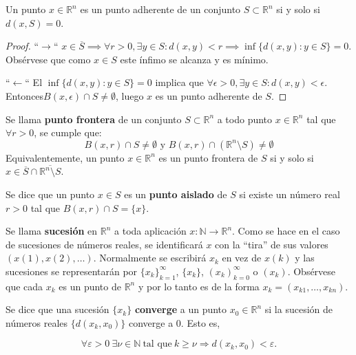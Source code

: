 \begin{teorema}
    Un punto $x \in \mathbb{R}^n$ es un punto adherente de un conjunto $S \subset \mathbb{R}^n$ si y solo si $d(x, S) = 0$.
\end{teorema}
\begin{proof}
    ``$\rightarrow$``
    $x \in \overline{S} \implies \forall r > 0, \exists y \in S : d(x, y) < r \implies \inf\{d(x, y) : y \in S\} = 0$. Obsérvese que como $x \in S$ este ínfimo se alcanza y es mínimo. 

    ``$\leftarrow$``
    El $\inf\{d(x, y) : y \in S\} = 0$ implica que $\forall \epsilon > 0, \exists y \in S : d(x, y) < \epsilon$. Entonces$B(x, \epsilon) \cap S \neq \emptyset$, luego $x$ es un punto adherente de $S$.
\end{proof}
\begin{definición}
    Se llama \textbf{punto frontera} de un conjunto $S \subset \mathbb{R}^n$ a todo punto $x \in \mathbb{R}^n$ tal que $\forall r > 0$, se cumple que: 
    $$B(x, r) \cap S \neq \emptyset \text{ y } B(x, r) \cap (\mathbb{R}^n \setminus S) \neq \emptyset$$
    Equivalentemente, un punto $x \in \mathbb{R}^n$ es un punto frontera de $S$ si y solo si $x \in \overline{S} \cap \overline{\mathbb{R}^n \setminus S}$.
\end{definición}
\begin{definición}
    Se dice que un punto $x \in S$ es un \textbf{punto aislado} de $S$ si existe un número real $r > 0$ tal que $B(x, r) \cap S = \{x\}$. 
\end{definición}

\begin{definición}[Sucesión]
    Se llama \textbf{sucesión} en \( \mathbb{R}^n \) a toda aplicación \( x : \mathbb{N} \to \mathbb{R}^n \). Como se hace en el caso de sucesiones de números reales, se identificará \( x \) con la ``tira'' de sus valores \( (x(1), x(2), \ldots) \). Normalmente se escribirá \( x_k \) en vez de \( x(k) \) y las sucesiones se representarán por \( \{x_k\}_{k=1}^{\infty} \), \( \{x_k\} \), \( (x_k)_{k=0}^{\infty} \) o \( (x_k) \). Obsérvese que cada \( x_k \) es un punto de \( \mathbb{R}^n \) y por lo tanto es de la forma \( x_k = (x_{k1}, \ldots, x_{kn}) \).
\end{definición}

\begin{definición}
    Se dice que una sucesión \( \{x_k\} \) \textbf{converge} a un punto \( x_0 \in \mathbb{R}^n \) si la sucesión de números reales \( \{d(x_k, x_0)\} \) converge a 0. Esto es,

    \[
    \forall \varepsilon > 0 \ \exists \nu \in \mathbb{N} \ \text{tal que} \ k \geq \nu \Rightarrow d(x_k, x_0) < \varepsilon.
    \]
\end{definición}


